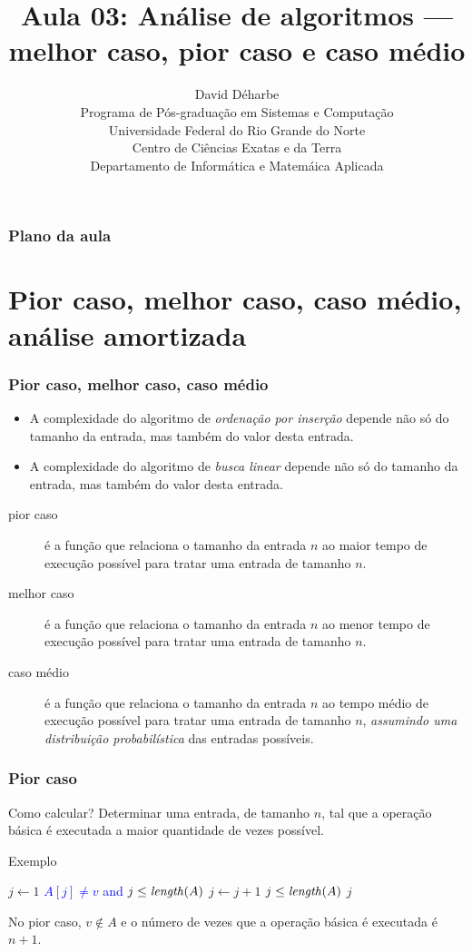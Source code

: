 \documentclass[handout]{beamer}
\title{Aula 03: Análise de algoritmos --- melhor caso, pior caso e caso médio}
\author{David Déharbe \\
  Programa de Pós-graduação em Sistemas e Computação \\
  Universidade Federal do Rio Grande do Norte \\
  Centro de Ciências Exatas e da Terra \\
  Departamento de Informática e Matemáica Aplicada}
\date{}
\begin{document}

\begin{frame}
  \titlepage
\end{frame}

\begin{frame}
  \frametitle{Plano da aula}
  \tableofcontents
\end{frame}

\section{Pior caso, melhor caso, caso médio, análise amortizada}

\begin{frame}
\frametitle{Pior caso, melhor caso, caso médio}

\begin{itemize}
\item A complexidade do algoritmo de \emph{ordenação por inserção} depende não
  só do tamanho da entrada, mas também do valor desta entrada.
\item A complexidade do algoritmo de \emph{busca linear} depende não só do
  tamanho da entrada, mas também do valor desta entrada.
\end{itemize}
\pause
\begin{description}
\item[pior caso] é a função que relaciona o tamanho da entrada $n$ ao maior tempo de execução possível para tratar uma entrada de tamanho $n$.
\item[melhor caso] é a função que relaciona o tamanho da entrada $n$ ao menor tempo de execução possível para tratar uma entrada de tamanho $n$.
\item[caso médio] é a função que relaciona o tamanho da entrada $n$ ao tempo médio de execução possível para tratar uma entrada de tamanho $n$, \emph{assumindo uma distribuição probabilística} das entradas possíveis.
\end{description}
\end{frame}

\begin{frame}
\frametitle{Pior caso}

\begin{block}{Como calcular?}
Determinar uma entrada, de tamanho $n$, tal que a operação básica é executada a maior quantidade de vezes possível.
\end{block}

\begin{block}{Exemplo}
\begin{codebox}
\li $j \gets 1$
\li \While \textcolor{blue}{$A[j] \neq v$ and $j \le \id{length}(A)$}
\li \Do
      $j \gets j+1$
    \End
\li \If $j \le \id{length}(A)$
\li \Then
      \Return $j$
\li \Else
      \Return {}
    \End
\end{codebox}
No pior caso, $v \not\in A$ e o número de vezes que a operação básica é
executada é $n+1$.
\end{block}

\end{frame}
\end{document}
